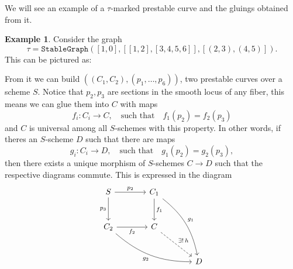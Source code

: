 \documentclass[11pt]{amsart}
\theoremstyle{definition}
\theoremstyle{remark}
\newcommand{\word}[1]{\quad\text{#1}\quad}
\theoremstyle{plain}
\theoremstyle{definition}
\newtheorem{Ex}[Th]{Example}
\theoremstyle{remark}
\begin{document}
\begin{ptcb}
  We will see an example of a \(\tau\)-marked prestable curve and the gluings obtained from it.

  \begin{Ex}
    Consider the graph
    \[
      \tau=\texttt{StableGraph}([1,0],[[1,2],[3,4,5,6]],[(2,3),(4,5)]).
    \]
    This can be pictured as:
    \begin{center}
    \end{center}
    From it we can build \(((C_1,C_2),(p_1,\dots,p_6))\), two prestable curves over a scheme \(S\). Notice that \(p_2,p_3\) are sections in the smooth locus of any fiber, this means we can glue them into \(C\) with maps 
    \[
      f_i:C_i\to C,\word{such that}f_1(p_2)=f_2(p_3)
    \]
    and \(C\) is universal among all \(S\)-schemes with this property. In other words, if theres an \(S\)-scheme \(D\) such that there are maps 
    \[
      g_i:C_i\to D,\word{such that}g_1(p_2)=g_2(p_3),
    \]
    then there exists a unique morphism of \(S\)-schemes \(C\to D\) such that the respective diagrams commute. This is expressed in the diagram
    \[
    \begin{tikzcd}[column sep=large,row sep=large]
      S \arrow[r,"p_2"] \arrow[d,"p_3"']
        & C_1 \arrow[d,"f_1"] \arrow[ddr,"g_1",bend left=20] & \\
      C_2 \arrow[r,"f_2"'] \arrow[drr,"g_2"',bend right=20]
        & C \arrow[dr,dashed,"\exists!\,h"] & \\
        & & D
  \end{tikzcd}
    \]
  \end{Ex}

\end{ptcb}
\end{document}

